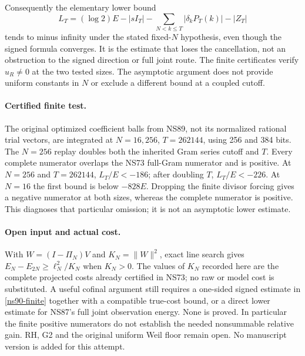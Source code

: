 Consequently the elementary lower bound
\[
 L_T=(\log2)E-|sI_T|-\sum_{N<k\le T}|\delta_kP_T(k)|-|Z_T|
\]
tends to minus infinity under the stated fixed-$N$ hypothesis, even though
the signed formula converges. It is the estimate that loses the
cancellation, not an obstruction to the signed direction or full joint
route. The finite certificates verify $u_R\ne0$ at the two tested sizes.
The asymptotic argument does not provide uniform constants in $N$ or
exclude a different bound at a coupled cutoff.

\paragraph{Certified finite test.}
The original optimized coefficient balls from NS89, not its normalized
rational trial vectors, are integrated at $N=16,256$, $T=262144$, using
256 and 384 bits. The $N=256$ replay doubles both the inherited Gram
series cutoff and $T$. Every complete numerator overlaps the NS73
full-Gram numerator and is positive. At $N=256$ and $T=262144$,
$L_T/E<-186$; after doubling $T$, $L_T/E<-226$.
At $N=16$ the first bound is below $-828E$.
Dropping the finite divisor forcing gives a negative numerator at both
sizes, whereas the complete numerator is positive. This diagnoses that
particular omission; it is not an asymptotic lower estimate.

\paragraph{Open input and actual cost.}
With $W=(I-\Pi_N)V$ and $K_N=\|W\|^2$, exact line search gives
$E_N-E_{2N}\ge\ell_N^2/K_N$ when $K_N>0$.
The values of $K_N$ recorded here are the complete projected costs already
certified in NS73; no raw or model cost is substituted. A useful cofinal
argument still requires a one-sided signed estimate in
\eqref{ns90-finite} together with a compatible true-cost bound, or a direct
lower estimate for NS87's full joint observation energy. None is proved.
In particular the finite positive numerators do not establish the needed
nonsummable relative gain. RH, G2 and the original uniform Weil floor
remain open. No manuscript version is added for this attempt.
